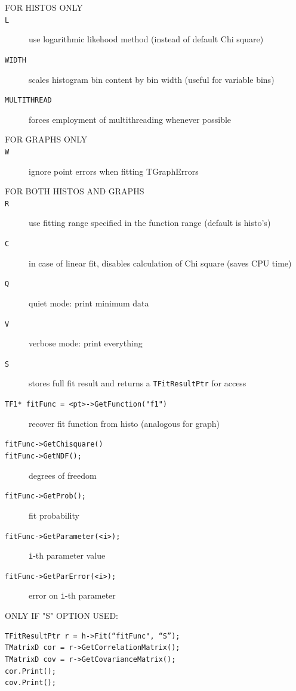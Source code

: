 \documentclass[10pt, twoside]{article}
\newcommand{\ttt}[1]{\colorbox{boxgray}{\texttt{#1}}}
\begin{document}
\begin{description}
\item[FOR HISTOS ONLY]
\item[\ttt{L}] use logarithmic likehood method (instead of default Chi square)

\item[\ttt{WIDTH}] scales histogram bin content by bin width (useful for variable bins)
\item[\ttt{MULTITHREAD}] forces employment of multithreading whenever possible
\item[FOR GRAPHS ONLY]
\item[\ttt{W}] ignore point errors when fitting TGraphErrors
\item[FOR BOTH HISTOS AND GRAPHS]
\item[\ttt{R}] use fitting range specified in the function range (default is histo's)
\item[\ttt{C}] in case of linear fit, disables calculation of Chi square (saves CPU time)
\item[\ttt{Q}] quiet mode: print minimum data
\item[\ttt{V}] verbose mode: print everything
\item[\ttt{S}] stores full fit result and returns a \ttt{TFitResultPtr} for access
\end{description}

\begin{description}
\item[\ttt{TF1* fitFunc = <pt>->GetFunction("f1")}] recover fit function from histo (analogous for graph)
\item[\ttt{fitFunc->GetChisquare()}]
\item[\ttt{fitFunc->GetNDF();}] degrees of freedom
\item[\ttt{fitFunc->GetProb();}] fit probability
\item[\ttt{fitFunc->GetParameter(<i>);}] \ttt{i}-th parameter value
\item[\ttt{fitFunc->GetParError(<i>);}] error on \ttt{i}-th parameter
\item[ONLY IF "S" OPTION USED:]
\end{description}
\begin{verbatim}
TFitResultPtr r = h->Fit(“fitFunc", “S”); 
TMatrixD cor = r->GetCorrelationMatrix();
TMatrixD cov = r->GetCovarianceMatrix();
cor.Print();
cov.Print();
\end{verbatim}
\end{document}
